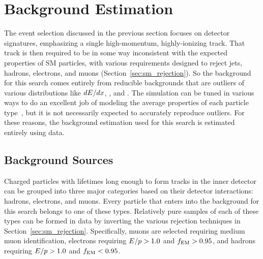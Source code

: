 \chapter{Background Estimation}

\label{ch:background}

The event selection discussed in the previous section focuses on detector signatures, emphasizing a single high-momentum, highly-ionizing track.
That track is then required to be in some way inconsistent with the expected properties of \ac{SM} particles, with various requirements designed to reject jets, hadrons, electrons, and muons (Section~\ref{sec:sm_rejection}).
So the background for this search comes entirely from reducible backgrounds that are outliers of various distributions like $dE/dx$, \emfrac, and \ptcone.
The simulation can be tuned in various ways to do an excellent job of modeling the average properties of each particle type~\cite{atlas_sim}, but it is not necessarily expected to accurately reproduce outliers.
For these reasons, the background estimation used for this search is estimated entirely using data.

\section{Background Sources}

Charged particles with lifetimes long enough to form tracks in the inner detector can be grouped into three major categories based on their detector interactions: hadrons, electrons, and muons. 
Every particle that enters into the background for this search belongs to one of these types.
Relatively pure samples of each of these types can be formed in data by inverting the various rejection techniques in Section~\ref{sec:sm_rejection}.
Specifically, muons are selected requiring medium muon identification, electrons requiring $E/p > 1.0$ and $f_\mathrm{EM} > 0.95$, and hadrons requiring $E/p > 1.0$ and $f_\mathrm{EM} < 0.95$. 

